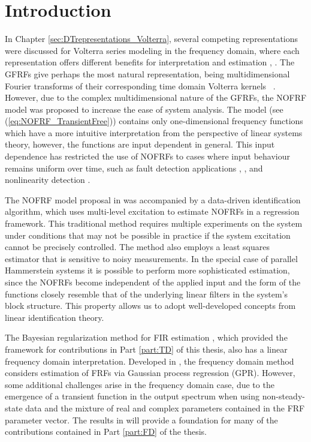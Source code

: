 \section{Introduction}

In Chapter \ref{sec:DTrepresentations_Volterra}, several competing representations were discussed for Volterra series modeling in the frequency domain, where each representation offers different benefits for interpretation and estimation \citep{Rijlaarsdam2017}, \citep{Cheng2017}. The GFRFs give perhaps the most natural representation, being multidimensional Fourier transforms of their corresponding time domain Volterra kernels ~\citep{George1959}. However, due to the complex multidimensional nature of the GFRFs, the NOFRF model was proposed \cite{Lang2005} to increase the ease of system analysis.  The model (see (\ref{eq:NOFRF_TransientFree})) contains only one-dimensional frequency functions which have a more intuitive interpretation from the perspective of linear systems theory, however, the functions are input dependent in general. This input dependence has restricted the use of NOFRFs to cases where input behaviour remains uniform over time, such as fault detection applications \citep{Peng2007}, \citep{Cao2013}, \citep{Xia2015} and nonlinearity detection \citep{Lang2008}. 

The NOFRF model proposal  in \cite{Lang2005} was accompanied by a data-driven identification algorithm, which uses multi-level excitation to estimate NOFRFs in a regression framework. This traditional method requires multiple experiments on the system under conditions that may not be possible in practice if the system excitation cannot be precisely controlled. The method also employs a least squares estimator that is sensitive to noisy measurements. In the special case of parallel Hammerstein systems it is possible to perform more sophisticated estimation, since the NOFRFs become independent of the applied input and the form of the functions closely resemble that of the underlying linear filters in the system's block structure. This property allows us to adopt well-developed concepts from linear identification theory.

The Bayesian regularization method for FIR estimation \cite{Pillonetto2010}, which provided the framework for contributions in Part \ref{part:TD} of this thesis, also has a linear frequency domain interpretation. Developed in \cite{Lataire2016}, the frequency domain method considers estimation of FRFs via Gaussian process regression (GPR). However, some additional challenges arise in the frequency domain case, due to the emergence of a transient function in the output spectrum when using non-steady-state data and the mixture of real and complex parameters contained in the FRF parameter vector. The results in \cite{Lataire2016} will provide a foundation for many of the contributions contained in Part \ref{part:FD} of the thesis. 

